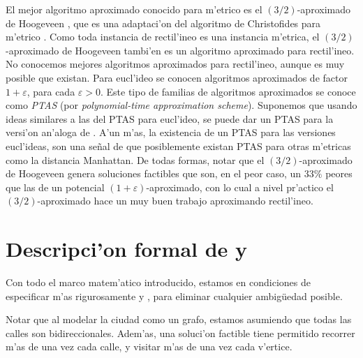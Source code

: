 El mejor algoritmo aproximado conocido para  m'etrico es el $(3/2)$-aproximado de Hoogeveen \cite{Ho91}, que es una adaptaci'on del algoritmo de Christofides para  m'etrico \cite{Ch76}. Como toda instancia de  rectil'ineo es una instancia m'etrica, el $(3/2)$-aproximado de Hoogeveen tambi'en es un algoritmo aproximado para  rectil'ineo. No conocemos mejores algoritmos aproximados para  rectil'ineo, aunque es muy posible que existan. Para  eucl'ideo se conocen algoritmos aproximados de factor $1 + \varepsilon$, para cada $\varepsilon > 0$. Este tipo de familias de algoritmos aproximados se conoce como \textit{PTAS} (por \textit{polynomial-time approximation scheme}). Suponemos que usando ideas similares a las del PTAS para  eucl'ideo, se puede dar un PTAS para la versi'on an'aloga de . A'un m'as, la existencia de un PTAS para las versiones eucl'ideas, son una se\~nal de que posiblemente existan PTAS para otras m'etricas como la distancia Manhattan. De todas formas, notar que el $(3/2)$-aproximado de Hoogeveen genera soluciones factibles que son, en el peor caso, un $33\%$ peores que las de un potencial $(1 + \varepsilon)$-aproximado, con lo cual a nivel pr'actico el $(3/2)$-aproximado hace un muy buen trabajo aproximando  rectil'ineo.

\section{Descripci'on formal de  y }

Con todo el marco matem'atico introducido, estamos en condiciones de especificar m'as rigurosamente  y , para eliminar cualquier ambig\"uedad posible.



Notar que al modelar la ciudad como un grafo, estamos asumiendo que todas las calles son bidireccionales. Adem'as, una soluci'on factible tiene permitido recorrer m'as de una vez cada calle, y visitar m'as de una vez cada v'ertice.

\clearpage


